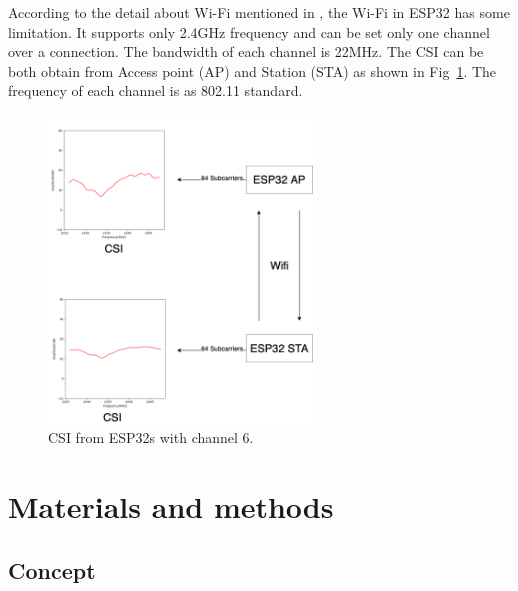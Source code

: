 \documentclass[10pt,letterpaper]{article}
\begin{document}
	According to the detail about Wi-Fi mentioned in , the Wi-Fi in ESP32 has some limitation. It supports only 2.4GHz frequency and can be set only one channel over a connection. The bandwidth of each channel is 22MHz. The CSI can be both obtain from Access point (AP) and Station (STA) as shown in Fig~\ref{fig:ESP32CSI01}.
	The frequency of each channel is as 802.11 standard.
	
	
	
	\begin{figure}[htbp]
		
		\centerline{\includegraphics[width=70mm,scale=0.5]{ESP32CSI01.png}}
		\caption{CSI from ESP32s with channel 6.}
		\label{fig:ESP32CSI01}
	\end{figure}
	

	
	\section*{Materials and methods}
	
	\subsection*{Concept}
	\label{concept}
	
\end{document}
